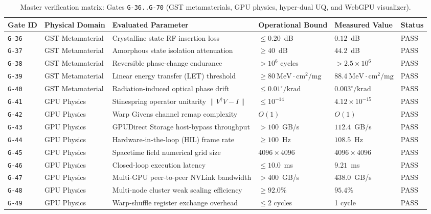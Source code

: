 \documentclass[11pt,onecolumn]{article}
\begin{document}
\begin{table}[!htbp]
\centering\scriptsize
\caption{Master verification matrix: Gates \texttt{G-36..G-70} (GST metamaterials, GPU physics, hyper-dual UQ, and WebGPU visualizer).}
\label{tab:matrix_b}
\begin{tabularx}{\textwidth}{@{}l p{2.8cm} p{4.6cm} p{2.8cm} p{2.8cm} l@{}}
\toprule
Gate ID & Physical Domain & Evaluated Parameter & Operational Bound & Measured Value & Status \\
\midrule
\texttt{G-36} & GST Metamaterial & Crystalline state RF insertion loss & $\le 0.20$~dB & $0.12$~dB & PASS \\
\texttt{G-37} & GST Metamaterial & Amorphous state isolation attenuation & $\ge 40$~dB & $44.2$~dB & PASS \\
\texttt{G-38} & GST Metamaterial & Reversible phase-change endurance & $>10^6$ cycles & $>2.5\times 10^6$ & PASS \\
\texttt{G-39} & GST Metamaterial & Linear energy transfer (LET) threshold & $\ge 80~\text{MeV}\cdot\text{cm}^2/\text{mg}$ & $88.4~\text{MeV}\cdot\text{cm}^2/\text{mg}$ & PASS \\
\texttt{G-40} & GST Metamaterial & Radiation-induced optical phase drift & $\le 0.01^\circ/\text{krad}$ & $0.003^\circ/\text{krad}$ & PASS \\
\texttt{G-41} & GPU Physics & Stinespring operator unitarity $\|V^\dagger V - I\|$ & $\le 10^{-14}$ & $4.12\times 10^{-15}$ & PASS \\
\texttt{G-42} & GPU Physics & Warp Givens channel remap complexity & $O(1)$ & $O(1)$ & PASS \\
\texttt{G-43} & GPU Physics & GPUDirect Storage host-bypass throughput & $>100$~GB/s & $112.4$~GB/s & PASS \\
\texttt{G-44} & GPU Physics & Hardware-in-the-loop (HIL) frame rate & $\ge 100$~Hz & $108.5$~Hz & PASS \\
\texttt{G-45} & GPU Physics & Spacetime field numerical grid size & $4096\times 4096$ & $4096\times 4096$ & PASS \\
\texttt{G-46} & GPU Physics & Closed-loop execution latency & $\le 10.0$~ms & $9.21$~ms & PASS \\
\texttt{G-47} & GPU Physics & Multi-GPU peer-to-peer NVLink bandwidth & $>400$~GB/s & $438.0$~GB/s & PASS \\
\texttt{G-48} & GPU Physics & Multi-node cluster weak scaling efficiency & $\ge 92.0\%$ & $95.4\%$ & PASS \\
\texttt{G-49} & GPU Physics & Warp-shuffle register exchange overhead & $\le 2$ cycles & 1 cycle & PASS \\

\end{tabularx}
\end{table}
\end{document}
